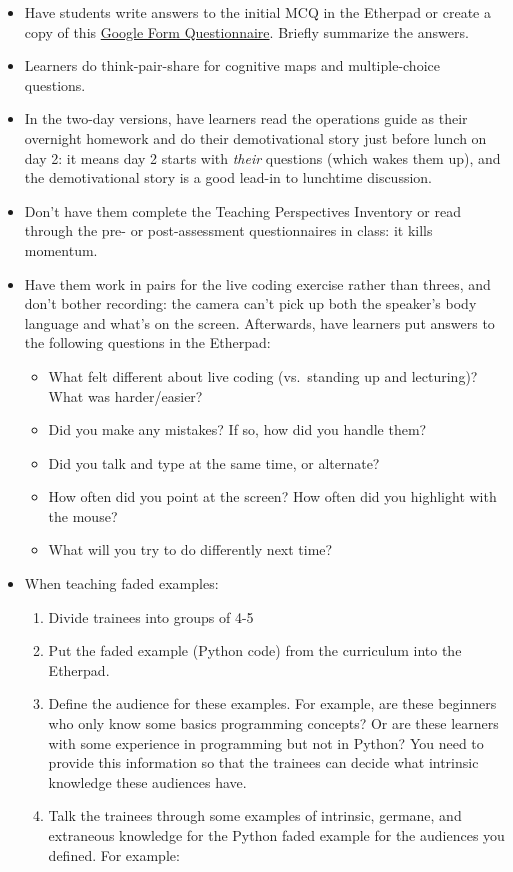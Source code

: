 \begin{itemize}
\item
  Have students write answers to the initial MCQ in the Etherpad or
  create a copy of this
  \href{http://goo.gl/forms/EHXfBSDmvqBLLVzj1}{Google Form
  Questionnaire}. Briefly summarize the answers.
\item
  Learners do think-pair-share for cognitive maps and multiple-choice
  questions.
\item
  In the two-day versions, have learners read the operations guide as
  their overnight homework and do their demotivational story just before
  lunch on day 2: it means day 2 starts with \emph{their} questions
  (which wakes them up), and the demotivational story is a good lead-in
  to lunchtime discussion.
\item
  Don't have them complete the Teaching Perspectives Inventory or read
  through the pre- or post-assessment questionnaires in class: it kills
  momentum.
\item
  Have them work in pairs for the live coding exercise rather than
  threes, and don't bother recording: the camera can't pick up both the
  speaker's body language and what's on the screen. Afterwards, have
  learners put answers to the following questions in the Etherpad:

  \begin{itemize}
  \itemsep1pt\parskip0pt
  \item
    What felt different about live coding (vs.~standing up and
    lecturing)? What was harder/easier?
  \item
    Did you make any mistakes? If so, how did you handle them?
  \item
    Did you talk and type at the same time, or alternate?
  \item
    How often did you point at the screen? How often did you highlight
    with the mouse?
  \item
    What will you try to do differently next time?
  \end{itemize}
\item
  When teaching faded examples:

  \begin{enumerate}
  \def\labelenumi{\arabic{enumi}.}
  \itemsep1pt\parskip0pt
  \item
    Divide trainees into groups of 4-5
  \item
    Put the faded example (Python code) from the curriculum into the
    Etherpad.
  \item
    Define the audience for these examples. For example, are these
    beginners who only know some basics programming concepts? Or are
    these learners with some experience in programming but not in
    Python? You need to provide this information so that the trainees
    can decide what intrinsic knowledge these audiences have.
  \item
    Talk the trainees through some examples of intrinsic, germane, and
    extraneous knowledge for the Python faded example for the audiences
    you defined. For example:


\end{enumerate}
\end{itemize}

